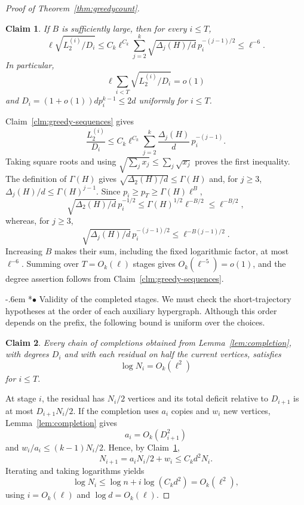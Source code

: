 \documentclass[11pt,reqno]{amsart}
\makeatletter
\numberwithin{equation}{section}
\renewcommand{\paragraph}{\@startsection{paragraph}{4}%
    \z@{.75\linespacing\@plus.2\linespacing\@minus.1\linespacing}%
    {-.6em}%
    {\normalfont\bfseries}}
\newcommand{\proofparagraph}[1]{%
    \paragraph*{$\bullet$ #1}\ignorespaces}
\theoremstyle{plain}
\newtheorem{claim}{Claim}[section]
\newenvironment{claimproof}[1][Proof]{\par
    \pushQED{\qed}%
    \renewcommand{\qedsymbol}{$\blacksquare$}
    \normalfont \topsep6\p@\@plus6\p@\relax
    \trivlist
    \item[\hskip\labelsep
    \textit{#1}\@addpunct{.}~]\ignorespaces
}{%
    \popQED\endtrivlist\@endpefalse
}
\theoremstyle{definition}
\makeatother
\begin{document}
\begin{proof}[Proof of Theorem~\ref{thm:greedycount}]
    \begin{claim}\label{clm:greedy-small-errors}
        If $B$ is sufficiently large, then for every $i\le T$,
        \[
            \ell\sqrt{L_2^{(i)}/D_i}
            \le C_k\ell^{C_k}\sum_{j=2}^k
            \sqrt{\Delta_j(H)/d}\,p_i^{-(j-1)/2}
            \le\ell^{-6}.
        \]
        In particular,
        \[
            \ell\sum_{i<T}\sqrt{L_2^{(i)}/D_i}=o(1)
        \]
        and $D_i=(1+o(1))dp_i^{k-1}\le2d$ uniformly for $i\le T$.
    \end{claim}
    \begin{claimproof}[Proof of Claim~\ref{clm:greedy-small-errors}]
        Claim~\ref{clm:greedy-sequences} gives
        \[
            \frac{L_2^{(i)}}{D_i}
            \le C_k\ell^{C_k}\sum_{j=2}^k
            \frac{\Delta_j(H)}d\,p_i^{-(j-1)}.
        \]
        Taking square roots and using $\sqrt{\sum_j x_j}\le\sum_j\sqrt{x_j}$ proves the first inequality.
        The definition of $\Gamma(H)$ gives $\sqrt{\Delta_2(H)/d}\le\Gamma(H)$ and, for $j\ge3$, $\Delta_j(H)/d\le\Gamma(H)^{j-1}$.
        Since $p_i\ge p_T\ge\Gamma(H)\ell^B$,
        \[
            \sqrt{\Delta_2(H)/d}\,p_i^{-1/2}
            \le\Gamma(H)^{1/2}\ell^{-B/2}\le\ell^{-B/2},
        \]
        whereas, for $j\ge3$,
        \[
            \sqrt{\Delta_j(H)/d}\,p_i^{-(j-1)/2}
            \le\ell^{-B(j-1)/2}.
        \]
        Increasing $B$ makes their sum, including the fixed logarithmic factor, at most $\ell^{-6}$.
        Summing over $T=O_k(\ell)$ stages gives $O_k(\ell^{-5})=o(1)$, and the degree assertion follows from Claim~\ref{clm:greedy-sequences}.
    \end{claimproof}

    \proofparagraph{Validity of the completed stages.}
    We must check the short-trajectory hypotheses at the order of each auxiliary hypergraph.
    Although this order depends on the prefix, the following bound is uniform over the choices.

    \begin{claim}\label{clm:greedy-orders}
        Every chain of completions obtained from Lemma~\ref{lem:completion}, with degrees $D_i$ and with each residual on half the current vertices, satisfies
        \[
            \log N_i=O_k(\ell^2)
        \]
        for $i\le T$.
    \end{claim}
    \begin{claimproof}[Proof of Claim~\ref{clm:greedy-orders}]
        At stage $i$, the residual has $N_i/2$ vertices and its total deficit relative to $D_{i+1}$ is at most $D_{i+1}N_i/2$.
        If the completion uses $a_i$ copies and $w_i$ new vertices, Lemma~\ref{lem:completion} gives
        \[
            a_i=O_k(D_{i+1}^2)
        \]
        and $w_i/a_i\le(k-1)N_i/2$.
        Hence, by Claim~\ref{clm:greedy-small-errors},
        \[
            N_{i+1}=a_iN_i/2+w_i\le C_kd^2N_i.
        \]
        Iterating and taking logarithms yields
        \[
            \log N_i\le\log n+i\log(C_kd^2)=O_k(\ell^2),
        \]
        using $i=O_k(\ell)$ and $\log d=O_k(\ell)$.
    \end{claimproof}


\end{proof}
\end{document}
